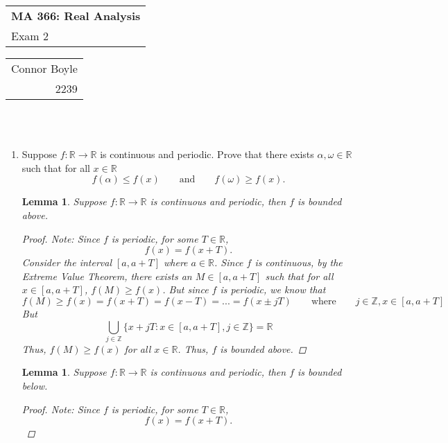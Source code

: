 \documentclass{amsart}
\def\name{Connor Boyle} %
\def\CM{2239} %
\def\hwnum{2} %
\newtheorem{lemma}[theorem]{Lemma}
\begin{document}
    \noindent
    \thispagestyle{firststyle}
    \begin{tabular}{l}
    {\LARGE \textbf{MA 366: Real Analysis} }\\
    {\Large Exam \hwnum}
    \end{tabular} \hfill \begin{tabular}{r}
                            \name \\
                            \CM
                            \end{tabular}
    
    \noindent \hrulefill \\\\
    \begin{enumerate}[1.]
    \item Suppose $f: \mathbb{R} \to \mathbb{R}$ is continuous and periodic. Prove that there exists $\alpha,\omega \in \mathbb{R}$ such that for all $x \in \mathbb{R}$
    \[ f(\alpha) \leq f(x) \qquad \text{and} \qquad f(\omega) \geq f(x).\]
    \begin{lemma}
        Suppose $f: \mathbb{R} \to \mathbb{R}$ is continuous and periodic, then $f$ is bounded above.
        \begin{proof}
            Note: Since $f$ is periodic, for some $T \in \mathbb{R}$, 
            \[
                f(x) = f(x+T).    
            \]
            Consider the interval $[a, a+ T]$ where $a \in \mathbb{R}$. Since $f$ is continuous, by the Extreme Value Theorem,  there exists an $M \in [a, a+T]$ such that for all $x \in [a, a+T]$,
            $f(M) \geq f(x)$. 
            But since $f$ is periodic, we know that 
            \[
                f(M) \geq f(x) = f(x+ T) = f(x - T) = ... = f(x \pm jT) \qquad \text{where} \qquad j \in \mathbb{Z}, x \in [a, a+ T]   
            \]
            But
            \[
                \bigcup_{j \in \mathbb{Z}} \{ x + jT : x\in [a, a+T], j \in \mathbb{Z}\} = \mathbb{R}    
            \]
            Thus, $f(M) \geq f(x)$ for all $x \in \mathbb{R}$. Thus, $f$ is bounded above.
        \end{proof}
    \end{lemma}
    \begin{lemma}
        Suppose $f: \mathbb{R} \to \mathbb{R}$ is continuous and periodic, then $f$ is bounded below.
        \begin{proof}
            Note: Since $f$ is periodic, for some $T \in \mathbb{R}$, 
            \[
                f(x) = f(x+T).    
            \]

\end{proof}
\end{lemma}
\end{enumerate}
\end{document}
